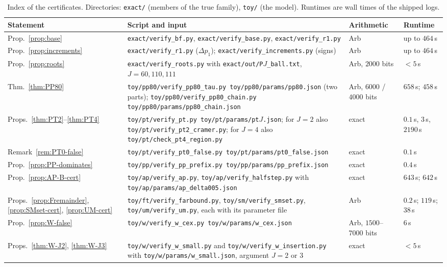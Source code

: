 \begin{table}[ht]
\centering\scriptsize
\caption{Index of the certificates. Directories: \texttt{exact/} (members of the true family), \texttt{toy/} (the
model). Runtimes are wall times of the shipped logs.}\label{tab:anc-index}
\begin{tabular}{@{}>{\raggedright\arraybackslash}p{}>{\raggedright\arraybackslash}p{}>{\raggedright\arraybackslash}p{}>{\raggedright\arraybackslash}p{}@{}}
\toprule
Statement & Script and input & Arithmetic & Runtime \\
\midrule
Prop.~\ref{prop:base} & \nolinkurl{exact/verify_bf.py}, \nolinkurl{exact/verify_base.py}, \nolinkurl{exact/verify_r1.py} &
Arb & up to $464$\,s \\
Prop.~\ref{prop:increments} & \nolinkurl{exact/verify_r1.py} ($\Delta p_1$); \nolinkurl{exact/verify_increments.py} (signs) &
Arb & up to $464$\,s \\
Prop.~\ref{prop:roots} & \nolinkurl{exact/verify_roots.py} with \nolinkurl{exact/out/P}$J$\nolinkurl{_ball.txt}, $J=60,110,111$ &
Arb, $2000$ bits & $<5$\,s \\
Thm.~\ref{thm:PP80} & \nolinkurl{toy/pp80/verify_pp80_tau.py toy/pp80/params/pp80.json} (two parts);
\nolinkurl{toy/pp80/verify_pp80_chain.py toy/pp80/params/pp80_chain.json} & Arb, $6000$ / $4000$ bits & $658$\,s; $458$\,s \\
Props.~\ref{thm:PT2}--\ref{thm:PT4} & \nolinkurl{toy/pt/verify_pt.py toy/pt/params/pt}$J$\nolinkurl{.json}; for $J=2$ also
\nolinkurl{toy/pt/verify_pt2_cramer.py}; for $J=4$ also \nolinkurl{toy/pt/check_pt4_region.py} & exact & $0.1$\,s, $3$\,s,
$2190$\,s \\
Remark~\ref{rem:PT0-false} & \nolinkurl{toy/pt/verify_pt0_false.py toy/pt/params/pt0_false.json} & exact & $0.1$\,s \\
Prop.~\ref{prop:PP-dominates} & \nolinkurl{toy/pp/verify_pp_prefix.py toy/pp/params/pp_prefix.json} & exact & $0.4$\,s \\
Prop.~\ref{prop:AP-B-cert} & \nolinkurl{toy/ap/verify_ap.py}, \nolinkurl{toy/ap/verify_halfstep.py} with
\nolinkurl{toy/ap/params/ap_delta005.json} & exact & $643$\,s; $642$\,s \\
Props.~\ref{prop:Fremainder}, \ref{prop:SMset-cert}, \ref{prop:UM-cert} & \nolinkurl{toy/ft/verify_farbound.py},
\nolinkurl{toy/sm/verify_smset.py}, \nolinkurl{toy/um/verify_um.py}, each with its parameter file & Arb & $0.2$\,s; $119$\,s; $38$\,s \\
Prop.~\ref{prop:W-false} & \nolinkurl{toy/w/verify_w_cex.py toy/w/params/w_cex.json} & Arb, $1500$--$7000$ bits & $6$\,s \\
Props.~\ref{thm:W-J2}, \ref{thm:W-J3} & \nolinkurl{toy/w/verify_w_small.py} and \nolinkurl{toy/w/verify_w_insertion.py} with
\nolinkurl{toy/w/params/w_small.json}, argument $J=2$ or $3$ & exact & $<5$\,s \\
\bottomrule
\end{tabular}
\end{table}

